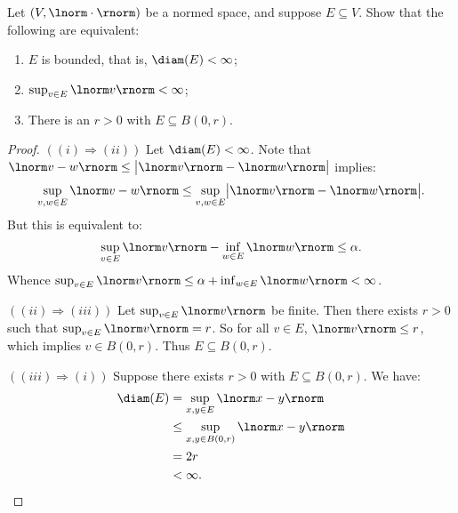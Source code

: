 \documentclass[11pt,twoside,openany]{memoir}
\begin{document}
    \begin{exercise}
        Let $(V,\lnorm \cdot \rnorm)$ be a normed space, and suppose $E \subseteq V$. Show that the following are equivalent:
            \begin{enumerate}[label = (\roman*),itemsep=1pt,topsep=3pt]
                \item $E$ is bounded, that is, $\diam(E) < \infty$;
                \item $\sup_{v \in E}\lnorm v \rnorm < \infty$;
                \item There is an $r > 0$ with $E \subseteq B(0,r)$.
            \end{enumerate}
    \end{exercise}
        \begin{proof}
            $((i) \Rightarrow (ii))$ Let $\diam(E) < \infty$. Note that $\lnorm v - w \rnorm \leq \bigl|\lnorm v \rnorm - \lnorm w \rnorm\bigr|$ implies:
                \begin{equation*}
                \begin{split}
                    \sup_{v,w \in E}\lnorm v-w \rnorm \leq \sup_{v,w \in E}\bigl| \lnorm v \rnorm - \lnorm w \rnorm \bigr|.
                \end{split}
                \end{equation*}
            But this is equivalent to:
                \begin{equation*}
                \begin{split}
                    \sup_{v \in E}\lnorm v \rnorm - \inf_{w \in E}\lnorm w \rnorm \leq \alpha.
                \end{split}
                \end{equation*}
            Whence $\sup_{v \in E}\lnorm v \rnorm \leq \alpha + \inf_{w \in E}\lnorm w \rnorm < \infty$.

            $((ii) \Rightarrow (iii))$ Let $\sup_{v \in E}\lnorm v \rnorm$ be finite. Then there exists $r>0$ such that $\sup_{v \in E}\lnorm v \rnorm = r$. So for all $v \in E$, $\lnorm v \rnorm \leq r$, which implies $v \in B(0,r)$. Thus $E \subseteq B(0,r)$.

            $((iii) \Rightarrow (i))$ Suppose there exists $r>0$ with $E \subseteq B(0,r)$. We have:
                \begin{equation*}
                \begin{split}
                    \diam(E) 
                    & = \sup_{x,y \in E}\lnorm x - y \rnorm \\
                    & \leq \sup_{x,y \in B(0,r)} \lnorm x-y \rnorm \\
                    & = 2r \\
                    & < \infty.
                \end{split}
                \end{equation*}
            
        \end{proof}
\end{document}
